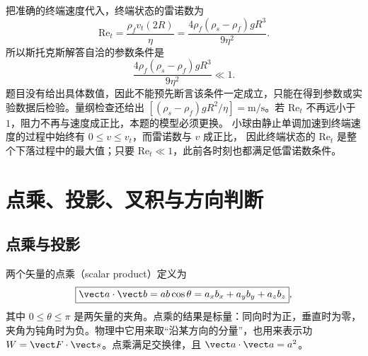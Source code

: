 \begin{xesolution}
把准确的终端速度代入，终端状态的雷诺数为
\begin{equation}
 \mathrm{Re}_t=\frac{\rho_f v_t(2R)}{\eta}
 =\frac{4\rho_f(\rho_s-\rho_f)gR^3}{9\eta^2}.
\end{equation}
所以斯托克斯解答自洽的参数条件是
\begin{equation}
 \boxed{\frac{4\rho_f(\rho_s-\rho_f)gR^3}{9\eta^2}\ll1}.
\end{equation}
题目没有给出具体数值，因此不能预先断言该条件一定成立，只能在得到参数或实验数据后检验。量纲检查还给出
$[(\rho_s-\rho_f)gR^2/\eta]=\mathrm{m/s}$。若 $\mathrm{Re}_t$ 不再远小于 $1$，阻力不再与速度成正比，本题的模型必须更换。
小球由静止单调加速到终端速度的过程中始终有 $0\le v\le v_t$，而雷诺数与 $v$ 成正比，
因此终端状态的 $\mathrm{Re}_t$ 是整个下落过程中的最大值；只要 $\mathrm{Re}_t\ll1$，此前各时刻也都满足低雷诺数条件。

\begin{center}
\label{ch01:fig:terminal-speed}
\end{center}
\end{xesolution}

\section{点乘、投影、叉积与方向判断}

\subsection{点乘与投影}

两个矢量的点乘（scalar product）定义为
\begin{equation}
 \boxed{\vect a\cdot\vect b=ab\cos\theta
 =a_xb_x+a_yb_y+a_zb_z},
\end{equation}
其中 $0\le\theta\le\pi$ 是两矢量的夹角。点乘的结果是标量：同向时为正，垂直时为零，夹角为钝角时为负。物理中它用来取“沿某方向的分量”，也用来表示功
$W=\vect F\cdot\vect s$。点乘满足交换律，且 $\vect a\cdot\vect a=a^2$。

